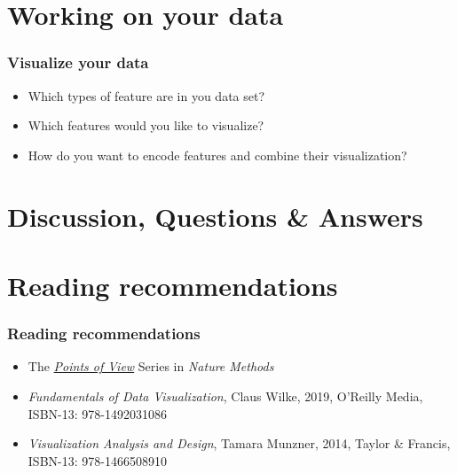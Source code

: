 \documentclass[aspectratio=169]{beamer}
\newcommand{\setfootercentertext}[1]{
\setbeamertemplate{footline}{
  \hspace*{\fill}
  \raisebox{3mm}[0mm][0mm]{
    \tiny{#1}}\hspace*{\fill}}
}
\begin{document}
\section{Working on your data}

\setfootercentertext{}

\begin{frame}{}
  \tableofcontents[currentsection]
\end{frame}

\begin{frame}
  \frametitle{Visualize your data}
  \begin{block}{}  
    \begin{center}
      \begin{itemize}
      \item Which types of feature are in you data set?
      \item Which features would you like to visualize?
      \item How do you want to encode features and combine their
        visualization?
      \end{itemize}
    \end{center}
  \end{block}    
\end{frame}



\section{Discussion, Questions \& Answers}

\begin{frame}{}
  \tableofcontents[currentsection]
\end{frame}

\section{Reading recommendations}


\begin{frame}
  \frametitle{Reading recommendations}
  \begin{block}{}  
    \begin{center}
      \begin{itemize}
      \item The
        \href{http://blogs.nature.com/methagora/2013/07/data-visualization-points-of-view.html}{\textit{Points
            of View}} Series in \textit{Nature Methods}
      \item \textit{Fundamentals of Data Visualization}, Claus Wilke,
        2019, O’Reilly Media, ISBN-13: 978-1492031086
      \item \textit{Visualization Analysis and Design}, Tamara
        Munzner, 2014, Taylor \& Francis, ISBN-13: 978-1466508910
      \end{itemize}
    \end{center}
  \end{block}    
\end{frame}
\end{document}
